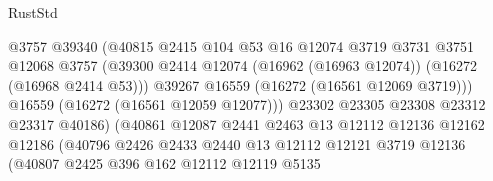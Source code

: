 \begin{lexlean}{RustStd}
\begin{coremodule}
                                        @3757
                                        @39340
                                        (@40815
                                          @2415
                                          @104
                                          @53
                                          @16
                                          @12074
                                          @3719
                                          @3731
                                          @3751
                                          @12068
                                          @3757
                                          (@39300
                                            @2414
                                            @12074
                                            (@16962 (@16963 @12074))
                                            (@16272 (@16968 @2414 @53)))
                                          @39267
                                          @16559
                                          (@16272 (@16561 @12069 @3719)))
                                        @16559
                                        (@16272 (@16561 @12059 @12077)))
                                      @23302
                                      @23305
                                      @23308
                                      @23312
                                      @23317
                                      @40186)
                                    (@40861
                                      @12087
                                      @2441
                                      @2463
                                      @13
                                      @12112
                                      @12136
                                      @12162
                                      @12186
                                      (@40796
                                        @2426
                                        @2433
                                        @2440
                                        @13
                                        @12112
                                        @12121
                                        @3719
                                        @12136
                                        (@40807
                                          @2425
                                          @396
                                          @162
                                          @12112
                                          @12119
                                          @5135

\end{coremodule}
\end{lexlean}
